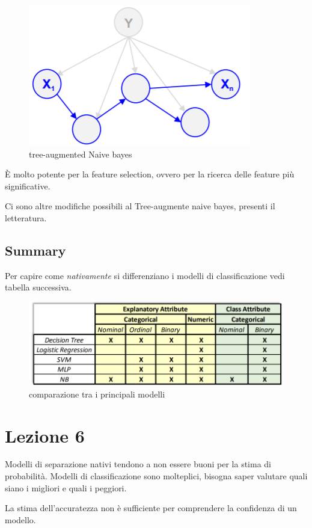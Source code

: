 \begin{figure}[h!]
	\centering
	\includegraphics[height=0.35 \linewidth]{classification/pict/treenaivebayes.png}
	\caption{tree-augmented Naive bayes}
\end{figure}

\`E molto potente per la feature selection, ovvero per la ricerca delle feature pi\`u significative. 

Ci sono altre modifiche possibili al Tree-augmente naive bayes, presenti il letteratura. 
\clearpage
\subsection{Summary}
Per capire come \textit{nativamente} si differenziano i modelli di classificazione vedi tabella successiva. 

\begin{figure}[h!]
	\centering
	\includegraphics[height=0.3 \linewidth]{classification/pict/class_tecniques.png}
	\caption{comparazione tra i principali modelli}
\end{figure}


\section{Lezione 6}
Modelli di separazione nativi tendono a non essere buoni per la stima di probabilit\`a.
Modelli di classificazione sono molteplici, bisogna saper valutare quali siano i migliori e quali i peggiori.

La stima dell'accuratezza non \`e sufficiente per comprendere la confidenza di un modello.

